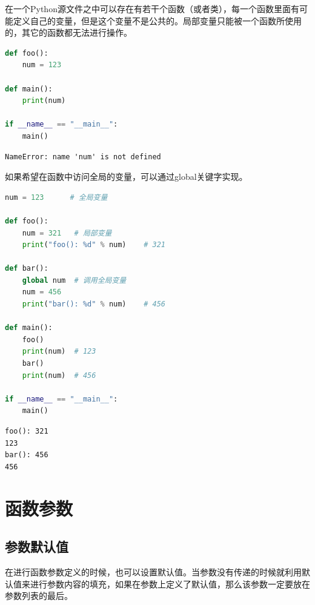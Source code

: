 在一个Python源文件之中可以存在有若干个函数（或者类），每一个函数里面有可能定义自己的变量，但是这个变量不是公共的。局部变量只能被一个函数所使用的，其它的函数都无法进行操作。\\


\begin{lstlisting}[language=Python]
def foo():
	num = 123

def main():
	print(num)

if __name__ == "__main__":
	main()
\end{lstlisting}

\begin{tcolorbox}
	\begin{verbatim}
NameError: name 'num' is not defined
\end{verbatim}
\end{tcolorbox}

如果希望在函数中访问全局的变量，可以通过global关键字实现。\\


\begin{lstlisting}[language=Python]
num = 123	   # 全局变量

def foo():
	num = 321   # 局部变量
	print("foo(): %d" % num)	# 321

def bar():
	global num  # 调用全局变量
	num = 456
	print("bar(): %d" % num)	# 456

def main():
	foo()
	print(num)  # 123
	bar()
	print(num)  # 456

if __name__ == "__main__":
	main()
\end{lstlisting}

\begin{tcolorbox}
	\begin{verbatim}
foo(): 321
123
bar(): 456
456
\end{verbatim}
\end{tcolorbox}

\newpage

\section{函数参数}

\subsection{参数默认值}

在进行函数参数定义的时候，也可以设置默认值。当参数没有传递的时候就利用默认值来进行参数内容的填充，如果在参数上定义了默认值，那么该参数一定要放在参数列表的最后。\\

